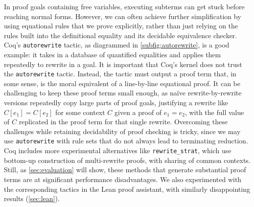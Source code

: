 In proof goals containing free variables, executing subterms can get stuck before reaching normal forms.
However, we can often achieve further simplification by using equational rules that we prove explicitly, rather than just relying on the rules built into the definitional equality and its decidable equivalence checker.
Coq's \texttt{autorewrite} tactic, as diagrammed in \autoref{subfig:autorewrite}, is a good example: it takes in a database of quantified equalities and applies them repeatedly to rewrite in a goal.
It is important that Coq's kernel does not trust the \texttt{autorewrite} tactic.
Instead, the tactic must output a proof term that, in some sense, is the moral equivalent of a line-by-line equational proof.
It can be challenging to keep these proof terms small enough, as naïve rewrite-by-rewrite versions repeatedly copy large parts of proof goals, justifying a rewrite like $C[e_1] = C[e_2]$ for some context $C$ given a proof of $e_1 = e_2$, with the full value of $C$ replicated in the proof term for that single rewrite.
Overcoming these challenges while retaining decidability of proof checking is tricky, since we may use \texttt{autorewrite} with rule sets that do not always lead to terminating reduction.
Coq includes more experimental alternatives like \texttt{rewrite\_strat}, which use bottom-up construction of multi-rewrite proofs, with sharing of common contexts.
Still, as \autoref{sec:evaluation} will show, these methods that generate substantial proof terms are at significant performance disadvantages.
We also experimented with the corresponding tactics in the Lean proof assistant, with similarly disappointing results (\autoref{sec:lean}).

